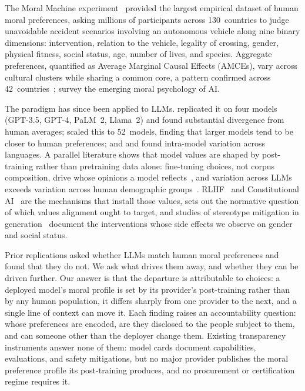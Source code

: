 \documentclass[manuscript,screen,review,anonymous]{acmart}
\begin{document}
The Moral Machine experiment~\cite{awad2018} provided the largest empirical
dataset of human moral preferences, asking millions of participants across
130~countries to judge unavoidable accident scenarios involving an autonomous
vehicle along nine binary dimensions: intervention, relation to the vehicle,
legality of crossing, gender, physical fitness, social status, age, number of
lives, and species. Aggregate preferences, quantified as Average Marginal Causal
Effects (AMCEs), vary across cultural clusters while sharing a common core, a
pattern confirmed across 42~countries~\cite{awad2020a}; \citet{bonnefon2024}
survey the emerging moral psychology of AI.

The paradigm has since been applied to LLMs. \citet{takemoto2024} replicated it
on four models (GPT-3.5, GPT-4, PaLM~2, Llama~2) and found substantial
divergence from human averages; \citet{ahmad2025} scaled this to 52~models,
finding that larger models tend to be closer to human preferences; and
\citet{vida2024} and \citet{jin2024} found intra-model variation across
languages. A parallel literature shows that model values are shaped by
post-training rather than pretraining data alone: fine-tuning choices, not corpus
composition, drive whose opinions a model reflects~\cite{santurkar2023}, and
variation across LLMs exceeds variation across human demographic
groups~\cite{kirgis2024}. RLHF~\cite{ouyang2022} and Constitutional
AI~\cite{bai2022} are the mechanisms that install those values,
\citet{gabriel2020} sets out the normative question of which values alignment
ought to target, and studies of stereotype mitigation in
generation~\cite{kotek2023,wan2023} document the interventions whose side
effects we observe on gender and social status.

Prior replications asked whether LLMs match human moral preferences and found
that they do not. We ask what drives them away, and whether they can be driven
further. Our answer is that the departure is attributable to choices: a deployed
model's moral profile is set by its provider's post-training rather than by any
human population, it differs sharply from one provider to the next, and a single
line of context can move it. Each finding raises an accountability question:
whose preferences are encoded, are they disclosed to the people subject to them,
and can someone other than the deployer change them. Existing transparency
instruments answer none of them: model cards document capabilities, evaluations,
and safety mitigations, but no major provider publishes the moral preference
profile its post-training produces, and no procurement or certification regime
requires it.
\end{document}
